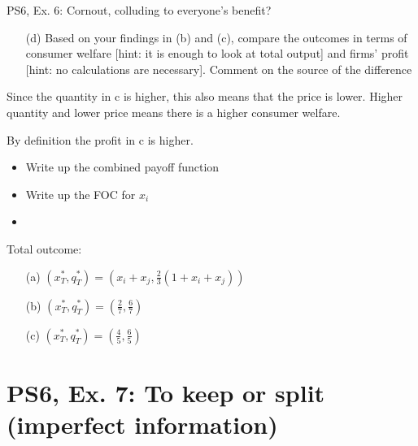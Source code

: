 \begin{frame}{PS6, Ex. 6: Cornout, colluding to everyone's benefit?}
    \begin{itemize}
    \item[(d)] Based on your findings in (b) and (c), compare the outcomes in terms of consumer
welfare [hint: it is enough to look at total output] and firms’ profit [hint: no calculations are necessary]. Comment on the source of the difference
    \end{itemize}
    \vfill\null
Since the quantity in c is higher, this also means that the price is lower. Higher quantity and lower price means there is a higher consumer welfare.

By definition the profit in c is higher.

\vspace{-10pt}
  \begin{multicols}{2}
    \begin{itemize}
      \item Write up the combined payoff function
      \item Write up the FOC for $x_i$
      \item {}
    \end{itemize}
    \vfill\null \columnbreak
    Total outcome:
    \begin{itemize}
    \item[(a)] $(x_T^{*},q_T^{*})= \left(x_i+x_j, \frac{2}{3}(1+x_i+x_j)\right)$
    \item[(b)] $(x_T^{*},q_T^{*})= \left(\frac{2}{7},\frac{6}{7}\right)$
    \item[(c)] $(x_T^{*},q_T^{*})= \left(\frac{4}{5},\frac{6}{5}\right)$
    \end{itemize}
    \vfill\null
  \end{multicols}
\end{frame}


\section{PS6, Ex. 7: To keep or split (imperfect information)}

